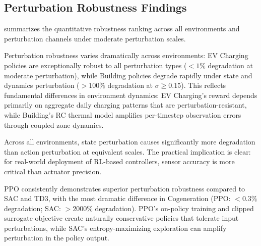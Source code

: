 \subsection{Perturbation Robustness Findings}
\label{sec:noise_findings}

 summarizes the quantitative robustness ranking across all environments and perturbation channels under moderate perturbation scales.




\begin{finding}
\label{find:noise_sensitivity}
Perturbation robustness varies dramatically across environments: EV Charging policies are exceptionally robust to all perturbation types ($<1\%$ degradation at moderate perturbation), while Building policies degrade rapidly under state and dynamics perturbation ($>100\%$ degradation at $\sigma \geq 0.15$). This reflects fundamental differences in environment dynamics: EV Charging's reward depends primarily on aggregate daily charging patterns that are perturbation-resistant, while Building's RC thermal model amplifies per-timestep observation errors through coupled zone dynamics.
\end{finding}

\begin{finding}
\label{find:obs_act_asymmetry}
Across all environments, state perturbation causes significantly more degradation than action perturbation at equivalent scales. The practical implication is clear: for real-world deployment of RL-based controllers, sensor accuracy is more critical than actuator precision.
\end{finding}

\begin{finding}
\label{find:algo_robustness}
PPO consistently demonstrates superior perturbation robustness compared to SAC and TD3, with the most dramatic difference in Cogeneration (PPO: $<0.3\%$ degradation; SAC: $>2000\%$ degradation). PPO's on-policy training and clipped surrogate objective create naturally conservative policies that tolerate input perturbations, while SAC's entropy-maximizing exploration can amplify perturbation in the policy output.
\end{finding}

